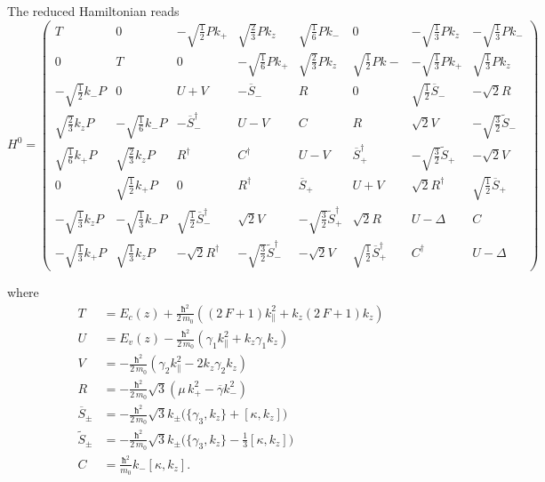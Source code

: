 \documentclass[prb,aps]{revtex4}
\begin{document}
		The reduced Hamiltonian reads 
		\begin{equation}
		    \renewcommand{\arraystretch}{3.5}
			\label{eq:H0}
			H^0=
			\begin{pmatrix}
				T & 0 &  -\sqrt{\frac12} P k_+  & \sqrt{\frac23} P k_z &\sqrt{\frac16} P k_- & 0  & -\sqrt{\frac13} P k_z & -\sqrt{\frac13} P k_-\\
				0 & T & 0 & -\sqrt{\frac16} P k_+ &  \sqrt{\frac23} P k_z & \sqrt{\frac12} P k- & -\sqrt{\frac13} P k_+ & \sqrt{\frac13} P k_z\\
				-\sqrt{\frac12}  k_- P & 0 & U+V & -\overline{S}_- & R & 0 & \sqrt{\frac12} \overline{S}_- & -\sqrt{2} R \\
				\sqrt{\frac23} k_z P & -\sqrt{\frac16} k_- P & - \overline{S}_-^\dagger & U-V & C & R & \sqrt{2} V & -\sqrt{\frac32} \tilde{S}_- \\
				\sqrt{\frac16} k_+ P & \sqrt{\frac23} k_z P & R^\dagger & C^\dagger & U-V & \overline{S}_+^\dagger & -\sqrt{\frac32} \tilde{S}_+ & -\sqrt{2} V \\
				0 & \sqrt{\frac12} k_+ P & 0 & R^\dagger & \overline{S}_+ & U+V & \sqrt{2} R^\dag & \sqrt{\frac12} \overline{S}_+ \\
				-\sqrt{\frac13} k_z P & -\sqrt{\frac13} k_- P & \sqrt{\frac12} \overline{S}^{\dag}_- & \sqrt{2} V & -\sqrt{\frac32} \tilde{S}^\dag_+ & \sqrt{2} R & U - Δ & C \\
				-\sqrt{\frac13} k_+ P & \sqrt{\frac13} k_z P & -\sqrt{2} R^\dag & -\sqrt{\frac32} \tilde{S}_-^\dag & -\sqrt{2} V & \sqrt{\frac12} \overline{S}_+^\dag & C^\dag & U - Δ
			\end{pmatrix}
		\end{equation}
		
		 where 
		 \begin{align}
			 T &= E_c(z) + \frac{ħ^2}{2\,m_0} \left( (2\,F+1) k_\parallel^2 + k_z (2\,F+1) k_z\right)  \\
			 U &= E_v(z) - \frac{ħ^2 }{2\,m_0} \left( γ_1 k_\parallel^2 + k_z γ_1 k_z \right) \\
			 V &=  - \frac{ħ^2 }{2\,m_0} \left( γ_2 k_\parallel^2 -2 k_z γ_2 k_z \right) \\
			R &= - \frac{ħ^2 }{2\,m_0} \sqrt{3} \left( μ\,k_+^2 - \overline{γ} k_-^2 \right) \\
			\overline{S}_\pm &= - \frac{ħ^2 }{2\,m_0} \sqrt{3}  k_\pm \Big( \{ γ_3 , k_z \} + [κ , k_z] \Big) \\
			\tilde{S}_\pm &= - \frac{ħ^2 }{2\,m_0} \sqrt{3}  k_\pm \Big( \{ γ_3 , k_z \} - \frac13 [κ , k_z] \Big) \\
			C &= \frac{ħ^2 }{m_0} k_- [κ , k_z ]  . 
		\end{align}
		
\end{document}
